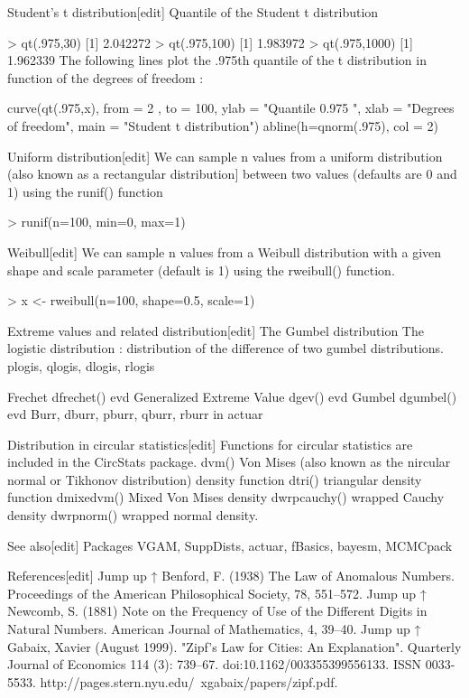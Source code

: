 \documentclass[12pt, a4paper]{article}
\theoremstyle{plain}
\theoremstyle{definition}
\theoremstyle{remark}
\begin{document}
Student's t distribution[edit]
Quantile of the Student t distribution

> qt(.975,30)
[1] 2.042272
> qt(.975,100)
[1] 1.983972
> qt(.975,1000)
[1] 1.962339
The following lines plot the .975th quantile of the t distribution in function of the degrees of freedom :

curve(qt(.975,x), from = 2 , to = 100, ylab = "Quantile 0.975 ", xlab = "Degrees of freedom", main = "Student t distribution")
abline(h=qnorm(.975), col = 2)


Uniform distribution[edit]
We can sample n values from a uniform distribution (also known as a rectangular distribution] between two values (defaults are 0 and 1) using the runif() function

> runif(n=100, min=0, max=1)


Weibull[edit]
We can sample n values from a Weibull distribution with a given shape and scale parameter \mu (default is 1) using the rweibull() function.

> x <- rweibull(n=100, shape=0.5, scale=1)


Extreme values and related distribution[edit]
The Gumbel distribution
The logistic distribution : distribution of the difference of two gumbel distributions.
plogis, qlogis, dlogis, rlogis

Frechet dfrechet() evd
Generalized Extreme Value dgev() evd
Gumbel dgumbel() evd
Burr, dburr, pburr, qburr, rburr in actuar


Distribution in circular statistics[edit]
Functions for circular statistics are included in the CircStats package.
dvm() Von Mises (also known as the nircular normal or Tikhonov distribution) density function
dtri() triangular density function
dmixedvm() Mixed Von Mises density
dwrpcauchy() wrapped Cauchy density
dwrpnorm() wrapped normal density.


See also[edit]
Packages VGAM, SuppDists, actuar, fBasics, bayesm, MCMCpack


References[edit]
Jump up ↑ Benford, F. (1938) The Law of Anomalous Numbers. Proceedings of the American Philosophical Society, 78, 551–572.
Jump up ↑ Newcomb, S. (1881) Note on the Frequency of Use of the Different Digits in Natural Numbers. American Journal of Mathematics, 4, 39–40.
Jump up ↑ Gabaix, Xavier (August 1999). "Zipf's Law for Cities: An Explanation". Quarterly Journal of Economics 114 (3): 739–67. doi:10.1162/003355399556133. ISSN 0033-5533. http://pages.stern.nyu.edu/~xgabaix/papers/zipf.pdf.

\end{document}
